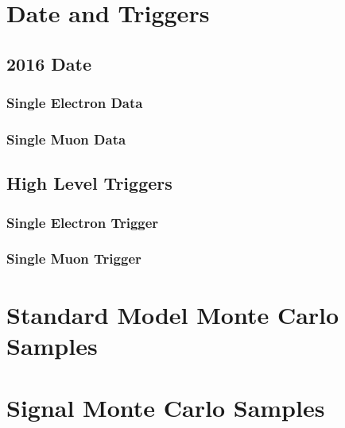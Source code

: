 \section{Date and Triggers}
\subsection{2016 Date}
\subsubsection{Single Electron Data}
\subsubsection{Single Muon Data}
\subsection{High Level Triggers}
\subsubsection{Single Electron Trigger}
\subsubsection{Single Muon Trigger}

\section{Standard Model Monte Carlo Samples}

\section{Signal Monte Carlo Samples}



